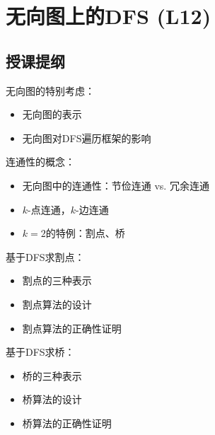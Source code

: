 \chapter{无向图上的DFS (L12)}

\section*{授课提纲}

\nid 无向图的特别考虑：
\begin{itemize}
    \item 无向图的表示
    \item 无向图对DFS遍历框架的影响
\end{itemize}


\nid 连通性的概念：
\begin{itemize}
    \item 无向图中的连通性：节俭连通 vs. 冗余连通
    \item $k$-点连通，$k$-边连通
    \item $k=2$的特例：割点、桥
\end{itemize}


\nid 基于DFS求割点：
\begin{itemize}
    \item 割点的三种表示
    \item 割点算法的设计
    \item 割点算法的正确性证明
\end{itemize}


\nid 基于DFS求桥：
\begin{itemize}
    \item 桥的三种表示
    \item 桥算法的设计
    \item 桥算法的正确性证明
\end{itemize}


